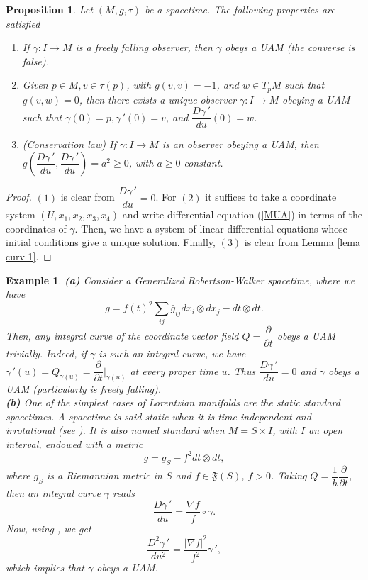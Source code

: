 \documentclass[11pt]{book}
\newtheorem{pro}[defi]{Proposition}
\newtheorem{ex}[defi]{Example}
\def\F{\mathfrak F}
\begin{document}
\begin{pro}\label{ac const}
	Let $(M,g,\tau)$ be a spacetime. The following properties are satisfied
	\begin{enumerate}
		\item[(1)] If $\gamma:I\to M$ is a freely falling observer, then $\gamma$ obeys a UAM (the converse is false).
		\item[(2)]\label{ac const unicity} Given $p\in M,v\in \tau(p)$, with $g(v,v)=-1$, and $w\in T_pM$ such that $g(v,w)=0$, then there exists a unique observer $\gamma : I\to M$ obeying a UAM such that $\gamma(0)=p,\gamma{\,'}(0)=v$, and $\dfrac{D\gamma{\,'}}{du}(0)=w$.
		\item[(3)] (Conservation law) If $\gamma : I\to M$ is an observer obeying a UAM, then $g\left(\dfrac{D\gamma{\,'}}{du},\dfrac{D\gamma{\,'}}{du}\right)=a^2\ge 0$, with $a\ge 0$ constant.
	\end{enumerate}
\end{pro}
\begin{proof}
	$(1)$ is clear from $\dfrac{D\gamma{\,'}}{du}=0$.
	For $(2)$ it suffices to take a coordinate system $(U,x_1,x_2,x_3,x_4)$ and write differential equation (\ref{MUA}) in terms of the coordinates of $\gamma$. Then, we have a system of linear differential equations whose initial conditions give a unique solution.
	Finally, $(3)$ is clear from Lemma \ref{lema curv 1}.
\end{proof}

\begin{ex}
	{\rm 
	{\bf (a)} Consider a Generalized Robertson-Walker spacetime, where we have 
	\[
	g = f(t)^2 \sum_{ij} \bar{g}_{ij} dx_i \otimes dx_j - dt \otimes dt . 
	\]
	Then, any integral curve of the coordinate vector field $Q= \dfrac{\partial}{\partial t}$ obeys a UAM trivially. Indeed, if $\gamma$ is such an integral curve, we have $\gamma{\,'}(u)=Q_{\gamma(u)}=\dfrac{\partial}{\partial t} |_{\gamma(u)}$ at every proper time $u$. Thus $\dfrac{D \gamma{\, '}}{du}=0$ and $\gamma$ obeys a UAM (particularly is freely falling).  \\
	{\bf (b)}\cite[Example 2.4(b)]{UAM} One of the simplest cases of Lorentzian manifolds are the static standard spacetimes. A spacetime is said static when it is time-independent and irrotational (see \cite[Section 7.2]{SW}). It is also named standard when $M=S\times I$, with $I$ an open interval, endowed with a metric
	\[
	g = g_S - f^2 dt \otimes dt,
	\]
	where $g_S$ is a Riemannian metric in $S$ and $f\in \F(S)$, $f>0$. Taking $Q=\dfrac{1}{h} \dfrac{\partial}{\partial t}$, then an integral curve $\gamma$ reads
	\[
	\frac{D\gamma{\, '}}{du}=\frac{\nabla f}{f} \circ \gamma.
	\]
	Now, using \cite[Proposition 7.35]{SRG}, we get
	\[
	\frac{D^2\gamma{\,'}}{du^2} = \frac{|\nabla f|^2}{f^2}\gamma{\,'},
	\]
	which implies that $\gamma$ obeys a UAM.
}
\end{ex}
\end{document}
